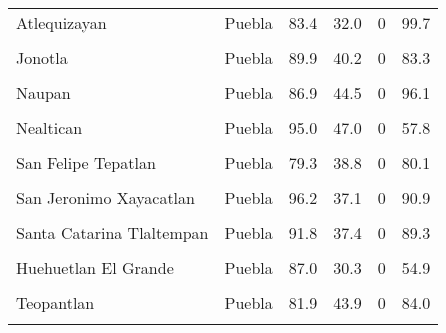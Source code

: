 \documentclass[
]{report}
\begin{document}
\begin{longtable}[t]{llrrrr}
Atlequizayan & Puebla & 83.4 & 32.0 & 0 & 99.7\\
\cellcolor{gray!6}{Jalpan} & \cellcolor{gray!6}{Puebla} & \cellcolor{gray!6}{92.0} & \cellcolor{gray!6}{35.8} & \cellcolor{gray!6}{0} & \cellcolor{gray!6}{53.7}\\
Jonotla & Puebla & 89.9 & 40.2 & 0 & 83.3\\
\addlinespace
\cellcolor{gray!6}{Jopala} & \cellcolor{gray!6}{Puebla} & \cellcolor{gray!6}{79.8} & \cellcolor{gray!6}{33.1} & \cellcolor{gray!6}{0} & \cellcolor{gray!6}{93.2}\\
Naupan & Puebla & 86.9 & 44.5 & 0 & 96.1\\
\cellcolor{gray!6}{Nauzontla} & \cellcolor{gray!6}{Puebla} & \cellcolor{gray!6}{93.1} & \cellcolor{gray!6}{39.3} & \cellcolor{gray!6}{0} & \cellcolor{gray!6}{82.1}\\
Nealtican & Puebla & 95.0 & 47.0 & 0 & 57.8\\
\cellcolor{gray!6}{San Antonio Canada} & \cellcolor{gray!6}{Puebla} & \cellcolor{gray!6}{77.6} & \cellcolor{gray!6}{41.2} & \cellcolor{gray!6}{0} & \cellcolor{gray!6}{65.9}\\
\addlinespace
San Felipe Tepatlan & Puebla & 79.3 & 38.8 & 0 & 80.1\\
\cellcolor{gray!6}{San Gabriel Chilac} & \cellcolor{gray!6}{Puebla} & \cellcolor{gray!6}{85.9} & \cellcolor{gray!6}{53.6} & \cellcolor{gray!6}{0} & \cellcolor{gray!6}{85.6}\\
San Jeronimo Xayacatlan & Puebla & 96.2 & 37.1 & 0 & 90.9\\
\cellcolor{gray!6}{San Jose Miahuatlan} & \cellcolor{gray!6}{Puebla} & \cellcolor{gray!6}{90.0} & \cellcolor{gray!6}{47.5} & \cellcolor{gray!6}{0} & \cellcolor{gray!6}{85.5}\\
Santa Catarina Tlaltempan & Puebla & 91.8 & 37.4 & 0 & 89.3\\
\addlinespace
\cellcolor{gray!6}{Santa Ines Ahuatempan} & \cellcolor{gray!6}{Puebla} & \cellcolor{gray!6}{88.5} & \cellcolor{gray!6}{28.8} & \cellcolor{gray!6}{0} & \cellcolor{gray!6}{80.2}\\
Huehuetlan El Grande & Puebla & 87.0 & 30.3 & 0 & 54.9\\
\cellcolor{gray!6}{Tenampulco} & \cellcolor{gray!6}{Puebla} & \cellcolor{gray!6}{92.3} & \cellcolor{gray!6}{38.3} & \cellcolor{gray!6}{0} & \cellcolor{gray!6}{50.6}\\
Teopantlan & Puebla & 81.9 & 43.9 & 0 & 84.0\\
\cellcolor{gray!6}{Teteles de Avila Castillo} & \cellcolor{gray!6}{Puebla} & \cellcolor{gray!6}{96.5} & \cellcolor{gray!6}{46.2} & \cellcolor{gray!6}{0} & \cellcolor{gray!6}{53.2}\\

\end{longtable}
\end{document}
